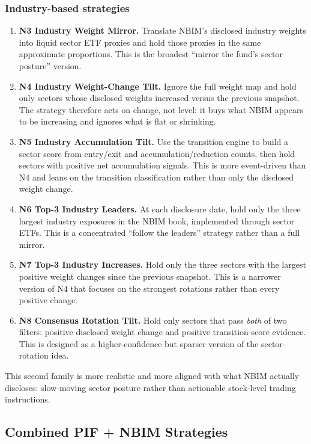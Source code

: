 \documentclass[conference]{IEEEtran}
\begin{document}
\subsubsection{Industry-based strategies}
\begin{enumerate}[leftmargin=1.4em]
    \item \textbf{N3 Industry Weight Mirror.} Translate NBIM's disclosed industry weights into liquid sector ETF proxies and hold those proxies in the same approximate proportions. This is the broadest ``mirror the fund's sector posture'' version.
    \item \textbf{N4 Industry Weight-Change Tilt.} Ignore the full weight map and hold only sectors whose disclosed weights increased versus the previous snapshot. The strategy therefore acts on change, not level: it buys what NBIM appears to be increasing and ignores what is flat or shrinking.
    \item \textbf{N5 Industry Accumulation Tilt.} Use the transition engine to build a sector score from entry/exit and accumulation/reduction counts, then hold sectors with positive net accumulation signals. This is more event-driven than N4 and leans on the transition classification rather than only the disclosed weight change.
    \item \textbf{N6 Top-3 Industry Leaders.} At each disclosure date, hold only the three largest industry exposures in the NBIM book, implemented through sector ETFs. This is a concentrated ``follow the leaders'' strategy rather than a full mirror.
    \item \textbf{N7 Top-3 Industry Increases.} Hold only the three sectors with the largest positive weight changes since the previous snapshot. This is a narrower version of N4 that focuses on the strongest rotations rather than every positive change.
    \item \textbf{N8 Consensus Rotation Tilt.} Hold only sectors that pass \emph{both} of two filters: positive disclosed weight change and positive transition-score evidence. This is designed as a higher-confidence but sparser version of the sector-rotation idea.
\end{enumerate}

This second family is more realistic and more aligned with what NBIM actually discloses: slow-moving sector posture rather than actionable stock-level trading instructions.

\subsection{Combined PIF + NBIM Strategies}
\end{document}
